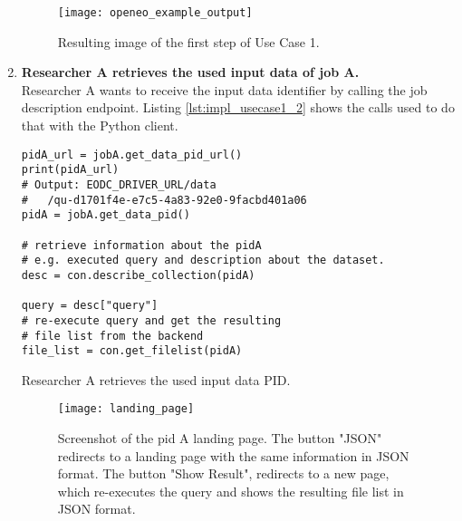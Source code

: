 \documentclass[draft,final]{vutinfth} %
\newenvironment{code}{\captionsetup{type=listing}}{}
\newcommand{\bgoesswein}[1]{{\color{blue}#1}}
\begin{document}
\begin{enumerate}
\begin{figure}[h]
	\centering
	\texttt{[image: openeo\_example\_output]}
	\caption{Resulting image of the first step of Use Case 1.}
	\label{fig:impl_usecase1_min} %
\end{figure}

	\item \textbf{Researcher A retrieves the used input data of job A.} \\
	Researcher A wants to receive the input data identifier by calling the job description endpoint. Listing \ref{lst:impl_usecase1_2} shows the calls used to do that with the Python client.

\begin{code}
	\begin{verbatim}
pidA_url = jobA.get_data_pid_url()
print(pidA_url)
# Output: EODC_DRIVER_URL/data
#	/qu-d1701f4e-e7c5-4a83-92e0-9facbd401a06
pidA = jobA.get_data_pid()

# retrieve information about the pidA 
# e.g. executed query and description about the dataset.
desc = con.describe_collection(pidA)

query = desc["query"]
# re-execute query and get the resulting 
# file list from the backend
file_list = con.get_filelist(pidA)
	\end{verbatim}
	\caption{Researcher A retrieves the used input data PID.}
	\label{lst:impl_usecase1_2}
\end{code}
	
	\begin{figure}[h]
		\centering
		\texttt{[image: landing\_page]}
		\caption{Screenshot of the \bgoesswein{pid A} landing page. The button "JSON" redirects to a landing page with the same information in JSON format. The button "Show Result", redirects to a new page, which re-executes the query and shows the resulting file list in JSON format. }
		\label{fig:landing_page} %
	\end{figure}
	

\end{enumerate}
\end{document}

